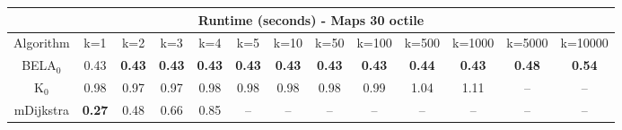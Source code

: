 \begin{tabular}{c|cccccccccccc}\toprule
\multicolumn{13}{c}{Runtime (seconds) - Maps 30 octile}\\ \midrule
Algorithm & k=1 & k=2 & k=3 & k=4 & k=5 & k=10 & k=50 & k=100 & k=500 & k=1000 & k=5000 & k=10000 \\ \midrule
BELA$_0$ & 0.43 & \textbf{0.43} & \textbf{0.43} & \textbf{0.43} & \textbf{0.43} & \textbf{0.43} & \textbf{0.43} & \textbf{0.43} & \textbf{0.44} & \textbf{0.43} & \textbf{0.48} & \textbf{0.54} \\
K$_0$ & 0.98 & 0.97 & 0.97 & 0.98 & 0.98 & 0.98 & 0.98 & 0.99 & 1.04 & 1.11 & -- & -- \\
mDijkstra & \textbf{0.27} & 0.48 & 0.66 & 0.85 & -- & -- & -- & -- & -- & -- & -- & -- \\ \bottomrule 
\end{tabular}
